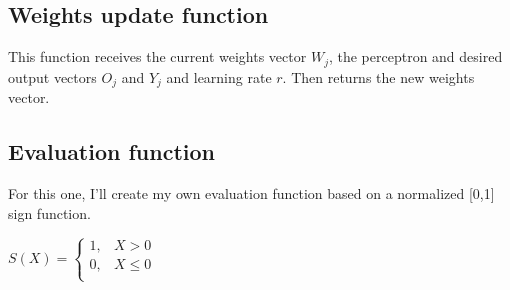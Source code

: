 \begin{Shaded}
\begin{Highlighting}[]
\OperatorTok{=}\OperatorTok{{-}}
\OperatorTok{=}\OperatorTok{/}
\end{Highlighting}
\end{Shaded}

\subsection{Weights update function}\label{weights-update-function}

This function receives the current weights vector \(W_j\), the
perceptron and desired output vectors \(O_j\) and \(Y_j\) and learning
rate \(r\). Then returns the new weights vector.

\begin{Shaded}
\begin{Highlighting}[]
\OperatorTok{=}\OperatorTok{{-}}\OperatorTok{{-}}\OperatorTok{*}\OperatorTok{*}
\end{Highlighting}
\end{Shaded}

\subsection{Evaluation function}\label{evaluation-function}

For this one, I'll create my own evaluation function based on a
normalized {[}0,1{]} sign function.

\(S(X) = \begin{cases}
  1, &X >     0\\
  0, &X \leq  0\\
\end{cases}\)

\begin{Shaded}
\begin{Highlighting}[]
  \OperatorTok{\textless{}}\NormalTok{ :}
     \OperatorTok{;}
   \OperatorTok{;}
\end{Highlighting}
\end{Shaded}

